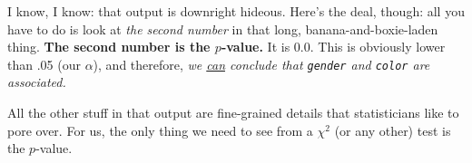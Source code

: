 
I know, I know: that output is downright hideous. Here's the deal, though: all
you have to do is look at \textit{the second number} in that long,
banana-and-boxie-laden thing. \textbf{The second number is the $p$-value.} It is
0.0. This is obviously lower than .05 (our $\alpha$), and therefore, \textit{we
\underline{can} conclude that \texttt{gender} and \texttt{color} are
associated.}

All the other stuff in that output are fine-grained details that statisticians
like to pore over. For us, the only thing we need to see from a $\chi^2$ (or
any other) test is the $p$-value.
